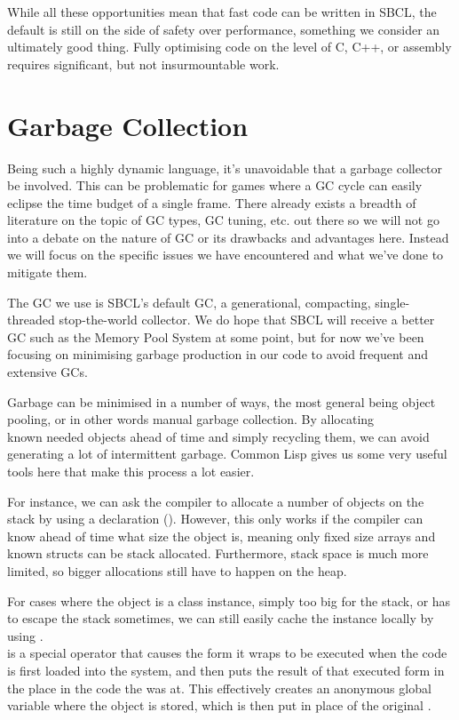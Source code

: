 \documentclass[a4paper]{paper}
\begin{document}
While all these opportunities mean that fast code can be written in SBCL, the default is still on the side of safety over performance, something we consider an ultimately good thing. Fully optimising code on the level of C, C++, or assembly requires significant, but not insurmountable work.

\section{Garbage Collection}
Being such a highly dynamic language, it's unavoidable that a garbage collector be involved. This can be problematic for games where a GC cycle can easily eclipse the time budget of a single frame. There already exists a breadth of literature on the topic of GC types, GC tuning, etc. out there so we will not go into a debate on the nature of GC or its drawbacks and advantages here. Instead we will focus on the specific issues we have encountered and what we've done to mitigate them.

The GC we use is SBCL's default GC, a generational, compacting, single-threaded stop-the-world collector. We do hope that SBCL will receive a better GC such as the Memory Pool System\cite{brooksby2002memory} at some point, but for now we've been focusing on minimising garbage production in our code to avoid frequent and extensive GCs.

Garbage can be minimised in a number of ways, the most general being object pooling, or in other words manual garbage collection. By allocating\\known needed objects ahead of time and simply recycling them, we can avoid generating a lot of intermittent garbage. Common Lisp gives us some very useful tools here that make this process a lot easier.

For instance, we can ask the compiler to allocate a number of objects on the stack by using a declaration (). However, this only works if the compiler can know ahead of time what size the object is, meaning only fixed size arrays and known structs can be stack allocated. Furthermore, stack space is much more limited, so bigger allocations still have to happen on the heap.

For cases where the object is a class instance, simply too big for the stack, or has to escape the stack sometimes, we can still easily cache the instance locally by using .\\ is a special operator that causes the form it wraps to be executed when the code is first loaded into the system, and then puts the result of that executed form in the place in the code the  was at. This effectively creates an anonymous global variable where the object is stored, which is then put in place of the original .
\end{document}
